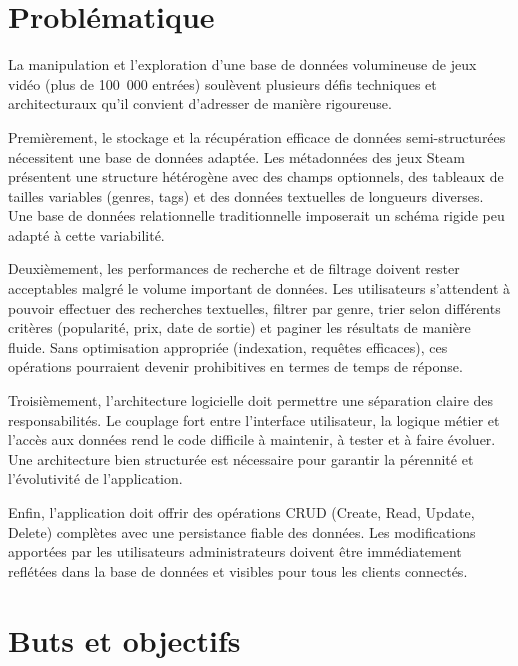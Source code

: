 \section{Problématique}
\label{sec:intro_prob_art}

La manipulation et l'exploration d'une base de données volumineuse de jeux vidéo (plus de 100~000 entrées) soulèvent plusieurs défis techniques et architecturaux qu'il convient d'adresser de manière rigoureuse.

Premièrement, le stockage et la récupération efficace de données semi-structurées nécessitent une base de données adaptée. Les métadonnées des jeux Steam présentent une structure hétérogène avec des champs optionnels, des tableaux de tailles variables (genres, tags) et des données textuelles de longueurs diverses. Une base de données relationnelle traditionnelle imposerait un schéma rigide peu adapté à cette variabilité.

Deuxièmement, les performances de recherche et de filtrage doivent rester acceptables malgré le volume important de données. Les utilisateurs s'attendent à pouvoir effectuer des recherches textuelles, filtrer par genre, trier selon différents critères (popularité, prix, date de sortie) et paginer les résultats de manière fluide. Sans optimisation appropriée (indexation, requêtes efficaces), ces opérations pourraient devenir prohibitives en termes de temps de réponse.

Troisièmement, l'architecture logicielle doit permettre une séparation claire des responsabilités. Le couplage fort entre l'interface utilisateur, la logique métier et l'accès aux données rend le code difficile à maintenir, à tester et à faire évoluer. Une architecture bien structurée est nécessaire pour garantir la pérennité et l'évolutivité de l'application.

Enfin, l'application doit offrir des opérations CRUD (Create, Read, Update, Delete) complètes avec une persistance fiable des données. Les modifications apportées par les utilisateurs administrateurs doivent être immédiatement reflétées dans la base de données et visibles pour tous les clients connectés.

\section{Buts et objectifs}
\label{sec:intro_aims_obj}

